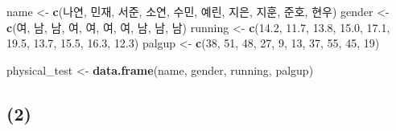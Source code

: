 \documentclass[
]{article}
\newenvironment{Shaded}{\begin{snugshade}}{\end{snugshade}}
\newcommand{\DecValTok}[1]{\textcolor[rgb]{0.00,0.00,0.81}{#1}}
\newcommand{\FloatTok}[1]{\textcolor[rgb]{0.00,0.00,0.81}{#1}}
\newcommand{\FunctionTok}[1]{\textcolor[rgb]{0.13,0.29,0.53}{\textbf{#1}}}
\newcommand{\NormalTok}[1]{#1}
\newcommand{\OtherTok}[1]{\textcolor[rgb]{0.56,0.35,0.01}{#1}}
\newcommand{\StringTok}[1]{\textcolor[rgb]{0.31,0.60,0.02}{#1}}
\begin{document}
\begin{Shaded}
\begin{Highlighting}[]
\NormalTok{name }\OtherTok{\textless{}{-}} \FunctionTok{c}\NormalTok{(}\StringTok{\textquotesingle{}나연\textquotesingle{}}\NormalTok{, }\StringTok{\textquotesingle{}민재\textquotesingle{}}\NormalTok{, }\StringTok{\textquotesingle{}서준\textquotesingle{}}\NormalTok{, }\StringTok{\textquotesingle{}소연\textquotesingle{}}\NormalTok{, }\StringTok{\textquotesingle{}수민\textquotesingle{}}\NormalTok{, }\StringTok{\textquotesingle{}예린\textquotesingle{}}\NormalTok{, }\StringTok{\textquotesingle{}지은\textquotesingle{}}\NormalTok{, }\StringTok{\textquotesingle{}지훈\textquotesingle{}}\NormalTok{, }\StringTok{\textquotesingle{}준호\textquotesingle{}}\NormalTok{, }\StringTok{\textquotesingle{}현우\textquotesingle{}}\NormalTok{)}
\NormalTok{gender }\OtherTok{\textless{}{-}} \FunctionTok{c}\NormalTok{(}\StringTok{\textquotesingle{}여\textquotesingle{}}\NormalTok{, }\StringTok{\textquotesingle{}남\textquotesingle{}}\NormalTok{, }\StringTok{\textquotesingle{}남\textquotesingle{}}\NormalTok{, }\StringTok{\textquotesingle{}여\textquotesingle{}}\NormalTok{, }\StringTok{\textquotesingle{}여\textquotesingle{}}\NormalTok{, }\StringTok{\textquotesingle{}여\textquotesingle{}}\NormalTok{, }\StringTok{\textquotesingle{}여\textquotesingle{}}\NormalTok{, }\StringTok{\textquotesingle{}남\textquotesingle{}}\NormalTok{, }\StringTok{\textquotesingle{}남\textquotesingle{}}\NormalTok{, }\StringTok{\textquotesingle{}남\textquotesingle{}}\NormalTok{)}
\NormalTok{running }\OtherTok{\textless{}{-}} \FunctionTok{c}\NormalTok{(}\FloatTok{14.2}\NormalTok{, }\FloatTok{11.7}\NormalTok{, }\FloatTok{13.8}\NormalTok{, }\FloatTok{15.0}\NormalTok{, }\FloatTok{17.1}\NormalTok{, }\FloatTok{19.5}\NormalTok{, }\FloatTok{13.7}\NormalTok{, }\FloatTok{15.5}\NormalTok{, }\FloatTok{16.3}\NormalTok{, }\FloatTok{12.3}\NormalTok{)}
\NormalTok{palgup }\OtherTok{\textless{}{-}} \FunctionTok{c}\NormalTok{(}\DecValTok{38}\NormalTok{, }\DecValTok{51}\NormalTok{, }\DecValTok{48}\NormalTok{, }\DecValTok{27}\NormalTok{, }\DecValTok{9}\NormalTok{, }\DecValTok{13}\NormalTok{, }\DecValTok{37}\NormalTok{, }\DecValTok{55}\NormalTok{, }\DecValTok{45}\NormalTok{, }\DecValTok{19}\NormalTok{)}

\NormalTok{physical\_test }\OtherTok{\textless{}{-}} \FunctionTok{data.frame}\NormalTok{(name, gender, running, palgup)}
\end{Highlighting}
\end{Shaded}

\subsection{(2)}\label{section-3}
\end{document}
